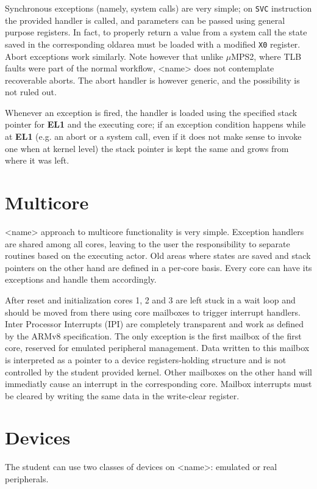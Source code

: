 \documentclass[12pt,a4paper,openright,twoside]{report}
\begin{document}
Synchronous exceptions (namely, system calls) are very simple; on {\tt SVC} 
instruction the provided handler is called, and parameters can be passed using
general purpose registers. In fact, to properly return a value from a system call
the state saved in the corresponding oldarea must be loaded with a modified 
{\tt X0} register.\\

Abort exceptions work similarly. Note however that unlike $\mu$MPS2, where TLB
faults were part of the normal workflow, <name> does not contemplate recoverable
aborts. The abort handler is however generic, and the possibility is not ruled
out.

Whenever an exception is fired, the handler is loaded using the specified stack
pointer for \textbf{EL1} and the executing core; if an exception condition happens
while at \textbf{EL1} (e.g. an abort or a system call, even if it does not make 
sense to invoke one when at kernel level) the stack pointer is kept the same
and grows from where it was left.

\section{Multicore}
<name> approach to multicore functionality is very simple. Exception handlers 
are shared among all cores, leaving to the user the responsibility to separate
routines based on the executing actor. Old areas where states are saved and stack
pointers on the other hand are defined in a per-core basis. Every core can have
its exceptions and handle them accordingly.

After reset and initialization cores 1, 2 and 3 are left stuck in a wait loop and
should be moved from there using core mailboxes to trigger interrupt handlers.
Inter Processor Interrupts (IPI) are completely transparent and work as defined
by the ARMv8 specification. The only exception is the first mailbox of the first
core, reserved for emulated peripheral management. Data written to this mailbox
is interpreted as a pointer to a device registers-holding structure and is not
controlled by the student provided kernel.
Other mailboxes on the other hand will immediatly cause an interrupt in the
corresponding core. Mailbox interrupts must be cleared by writing the same data
in the write-clear register.

\section{Devices}
The student can use two classes of devices on <name>: emulated or real peripherals.
\end{document}

